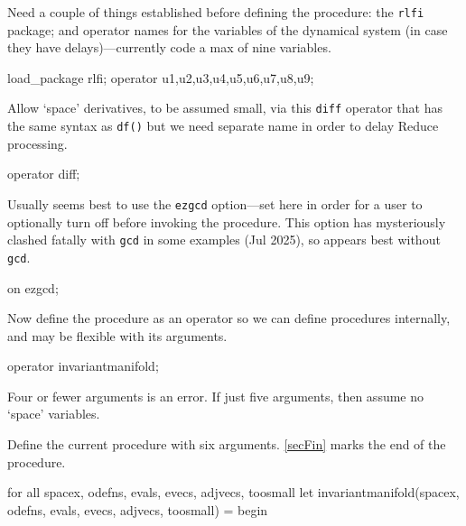 \documentclass[11pt,a5paper]{article}
\begin{document}
Need a couple of things established before defining the
procedure: the \verb|rlfi| package; and operator names for
the variables of the dynamical system (in case they have
delays)---currently code a max of nine variables.
\begin{reduce}
load_package rlfi; 
operator u1,u2,u3,u4,u5,u6,u7,u8,u9;
\end{reduce}
Allow `space' derivatives, to be assumed small, via this
\verb|diff| operator that has the same syntax as \verb|df()|
but we need separate name in order to delay Reduce
processing.
\begin{reduce}
operator diff;
\end{reduce}
Usually seems best to use the \verb|ezgcd| option---set here in order for a user to
optionally turn off before invoking the procedure.  This option has mysteriously clashed fatally with \verb|gcd| in some examples (Jul 2025), so appears best without \verb|gcd|.
\begin{reduce}
on ezgcd; 
\end{reduce}

Now define the procedure as an operator so we can define
procedures internally, and may be flexible with its
arguments. 
\begin{reduce}
operator invariantmanifold;
\end{reduce}
Four or fewer arguments is an error.
If just five arguments, then assume no `space' variables.

Define the current procedure with six arguments. 
\eqref{secFin} marks the end of the procedure.
\begin{reduce}
for all spacex, odefns, evals, evecs, adjvecs, toosmall 
    let invariantmanifold(spacex, odefns, evals, evecs, 
        adjvecs, toosmall) = begin 
\end{reduce}
\end{document}

